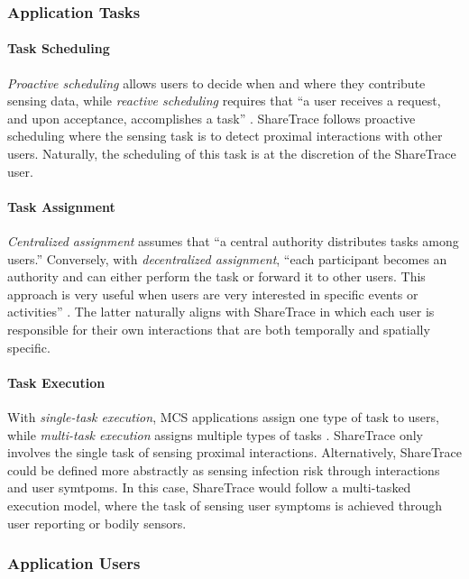 \subsubsection{Application Tasks}

\paragraph{Task Scheduling}

\emph{Proactive scheduling} allows users to decide when and where they contribute sensing data, while \emph{reactive scheduling} requires that ``a user receives a request, and upon acceptance, accomplishes a task'' \cite{Capponi2019}. ShareTrace follows proactive scheduling where the sensing task is to detect proximal interactions with other users. Naturally, the scheduling of this task is at the discretion of the ShareTrace user.

\paragraph{Task Assignment}

\emph{Centralized assignment} assumes that ``a central authority distributes tasks among users.'' Conversely, with \emph{decentralized assignment}, ``each participant becomes an authority and can either perform the task or forward it to other users. This approach is very useful when users are very interested in specific events or activities'' \cite{Capponi2019}. The latter naturally aligns with ShareTrace in which each user is responsible for their own interactions that are both temporally and spatially specific.

\paragraph{Task Execution}

With \emph{single-task execution}, MCS applications assign one type of task to users, while \emph{multi-task execution} assigns  multiple types of tasks \cite{Capponi2019}. ShareTrace only involves the single task of sensing proximal interactions. Alternatively, ShareTrace could be defined more abstractly as sensing infection risk through interactions and user symtpoms. In this case, ShareTrace would follow a multi-tasked execution model, where the task of sensing user symptoms is achieved through user reporting or bodily sensors.

\subsubsection{Application Users}

